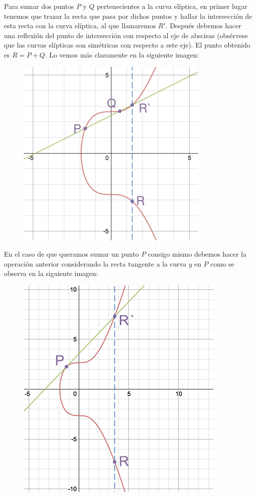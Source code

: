\documentclass[twoside]{article}
\theoremstyle{definition}
\begin{document}
Para sumar dos puntos $P$ y $Q$ pertenecientes a la curva elíptica, en primer lugar tenemos que trazar la recta que pasa por dichos puntos y hallar la intersección de esta recta con la curva elíptica, al que llamaremos $R'$. Después debemos hacer una reflexión del punto de intersección con respecto al eje de abscisas (obsérvese que las curvas elípticas son simétricas con respecto a este eje). El punto obtenido es $R=P+Q$. Lo vemos más claramente en la siguiente imagen: 
\begin{figure}[h!]
\includegraphics[scale=0.4]{sumec}
\end{figure}

En el caso de que queramos sumar un punto $P$ consigo mismo debemos hacer la operación anterior considerando la recta tangente a la curva $y$ en $P$ como se observa en la siguiente imagen:

\begin{figure}[h!]
\includegraphics[scale=0.4]{pmasp}
\end{figure}
\end{document}

